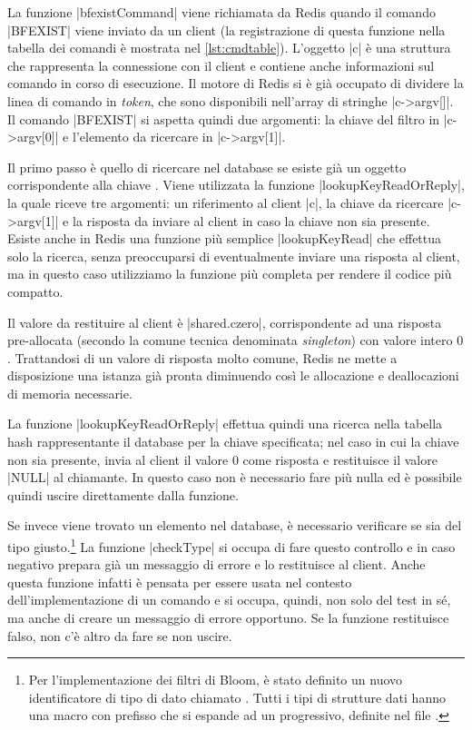 La funzione \cverb|bfexistCommand| viene richiamata da Redis quando il comando \cverb|BFEXIST| viene
inviato da un client (la registrazione di questa funzione nella tabella dei comandi è mostrata nel
\autoref{lst:cmdtable}). L'oggetto \cverb|c| è una struttura che rappresenta la connessione con il
client e contiene anche informazioni sul comando in corso di esecuzione. Il motore di Redis si è
già occupato di dividere la linea di comando in \emph{token}, che sono disponibili nell'array di
stringhe \cverb|c->argv[]|. Il comando \cverb|BFEXIST| si aspetta quindi due argomenti: la chiave
del filtro in \cverb|c->argv[0]| e l'elemento da ricercare in \cverb|c->argv[1]|.

Il primo passo è quello di ricercare nel database se esiste già un oggetto corrispondente alla
chiave . Viene utilizzata la funzione \cverb|lookupKeyReadOrReply|, la quale riceve
tre argomenti: un riferimento al client \cverb|c|, la chiave da ricercare \cverb|c->argv[1]| e 
la risposta da inviare al client in caso la chiave non sia presente. Esiste anche in Redis una
funzione più semplice \cverb|lookupKeyRead| che effettua solo la ricerca, senza preoccuparsi
di eventualmente inviare una risposta al client, ma in questo caso utilizziamo la funzione
più completa per rendere il codice più compatto.

Il valore da restituire al client è \cverb|shared.czero|, corrispondente ad una risposta pre-allocata
(secondo la comune tecnica denominata \emph{singleton}) con valore intero $0$. Trattandosi di un
valore di risposta molto comune, Redis ne mette a disposizione una istanza già pronta diminuendo
così le allocazione e deallocazioni di memoria necessarie.

La funzione \cverb|lookupKeyReadOrReply| effettua quindi una ricerca nella tabella hash
rappresentante il database per la chiave specificata; nel caso in cui la chiave non sia presente, invia
al client il valore $0$ come risposta e restituisce il valore \cverb|NULL| al chiamante. In questo
caso non è necessario fare più nulla ed è possibile quindi uscire direttamente dalla funzione.

Se invece viene trovato un elemento nel database, è necessario verificare se sia del tipo
giusto.\footnote{Per l'implementazione dei filtri di Bloom, è stato definito un nuovo identificatore
di tipo di dato chiamato . Tutti i tipi di strutture dati hanno una macro con
prefisso  che si espande ad un progressivo, definite nel file .} La
funzione \cverb|checkType| si occupa di fare questo controllo  e in caso negativo
prepara già un messaggio di errore e lo restituisce al client. Anche questa funzione infatti è
pensata per essere usata nel contesto dell'implementazione di un comando e si occupa, quindi, non solo
del test in sé, ma anche di creare un messaggio di errore opportuno. Se la funzione restituisce
falso, non c'è altro da fare se non uscire.

